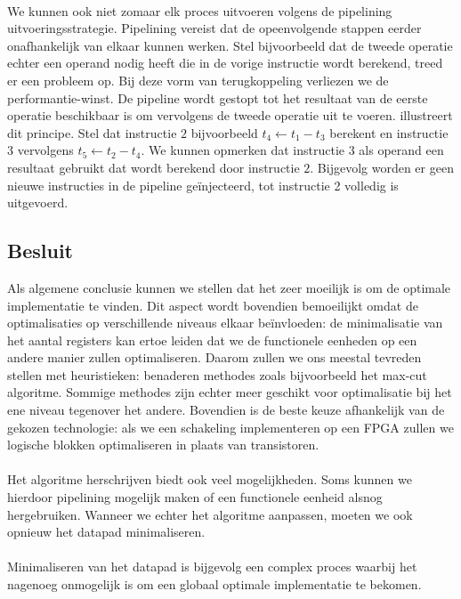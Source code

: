 \paragraph{}
We kunnen ook niet zomaar elk proces uitvoeren volgens de pipelining uitvoeringsstrategie. Pipelining vereist dat de opeenvolgende stappen eerder onafhankelijk van elkaar kunnen werken. Stel bijvoorbeeld dat de tweede operatie echter een operand nodig heeft die in de vorige instructie wordt berekend, treed er een probleem op. Bij deze vorm van terugkoppeling verliezen we de performantie-winst. De pipeline wordt gestopt tot het resultaat van de eerste operatie beschikbaar is om vervolgens de tweede operatie uit te voeren.  illustreert dit principe. Stel dat instructie $2$ bijvoorbeeld $t_4\leftarrow t_1-t_3$ berekent en instructie $3$ vervolgens $t_5\leftarrow t_2-t_4$. We kunnen opmerken dat instructie $3$ als operand een resultaat gebruikt dat wordt berekend door instructie $2$. Bijgevolg worden er geen nieuwe instructies in de pipeline ge\"injecteerd, tot instructie 2 volledig is uitgevoerd.
\subsection{Besluit}
Als algemene conclusie kunnen we stellen dat het zeer moeilijk is om de optimale implementatie te vinden. Dit aspect wordt bovendien bemoeilijkt omdat de optimalisaties op verschillende niveaus elkaar be\"invloeden: de minimalisatie van het aantal registers kan ertoe leiden dat we de functionele eenheden op een andere manier zullen optimaliseren. Daarom zullen we ons meestal tevreden stellen met heuristieken: benaderen methodes zoals bijvoorbeeld het max-cut algoritme. Sommige methodes zijn echter meer geschikt voor optimalisatie bij het ene niveau tegenover het andere. Bovendien is de beste keuze afhankelijk van de gekozen technologie: als we een schakeling implementeren op een FPGA zullen we logische blokken optimaliseren in plaats van transistoren.
\paragraph{}
Het algoritme herschrijven biedt ook veel mogelijkheden. Soms kunnen we hierdoor pipelining mogelijk maken of een functionele eenheid alsnog hergebruiken. Wanneer we echter het algoritme aanpassen, moeten we ook opnieuw het datapad minimaliseren.
\paragraph{}
Minimaliseren van het datapad is bijgevolg een complex proces waarbij het nagenoeg onmogelijk is om een globaal optimale implementatie te bekomen.
